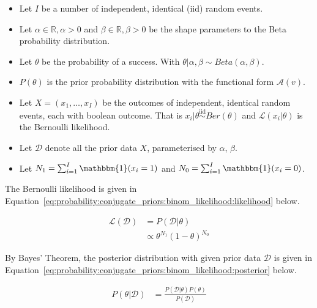 \begin{itemize}
      \item Let $I$ be a number of independent, identical  (iid) random events.

      \item Let $\alpha \in \mathbb{R}, \alpha > 0$ and $\beta \in \mathbb{R}, \beta >0$ be the shape parameters to the Beta probability distribution.

      \item Let $\theta$ be the probability of a success. With $\theta | \alpha, \beta \sim Beta(\alpha, \beta)$.

      \item $P(\theta)$ is the prior probability distribution with the functional form $\mathcal{A}(v)$.

      \item Let $X = (x_{1}, \dots, x_{I})$ be the outcomes of independent, identical random events, each with boolean outcome. That is $x_{i} | \theta \overset{\text{iid}}{\sim} Ber(\theta)$ and $\mathcal{L}(x_{i} \vert \theta)$ is the Bernoulli likelihood.

      \item Let $\mathcal{D}$ denote all the prior data $X$, parameterised by $\alpha$, $\beta$.

      \item Let $N_{1} = \sum_{i=1}^{I} \mathbbm{1}(x_{i} = 1)$ and $N_{0} = \sum_{i=1}^{I} \mathbbm{1}(x_{i} = 0)$.
\end{itemize}

The Bernoulli likelihood is given in Equation~\eqref{eq:probability:conjugate_priors:binom_likelihood:likelihood} below.

\begin{equation}
      \label{eq:probability:conjugate_priors:binom_likelihood:likelihood}
      \begin{split}
            \mathcal{L}(\mathcal{D}) &=  P(\mathcal{D} | \theta) \\
            &\propto \theta^{N_{1}}(1-\theta)^{N_{0}}
      \end{split}
\end{equation}

By Bayes' Theorem, the posterior distribution with given prior data $\mathcal{D}$ is given in Equation~\eqref{eq:probability:conjugate_priors:binom_likelihood:posterior} below.

\begin{equation}
      \begin{split}
            \label{eq:probability:conjugate_priors:binom_likelihood:posterior}
            P(\theta \vert \mathcal{D}) &= \frac{P(\mathcal{D} | \theta) P(\theta)}{P(\mathcal{D})}
      \end{split}
\end{equation}

